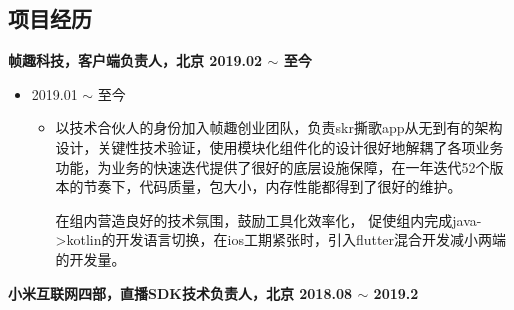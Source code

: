 \documentclass[line,margin,UTF8]{res}
\begin{document}
 
\address{15718887533}

\begin{resume}
 


\section{项目经历} 
{\bf 帧趣科技，客户端负责人，北京 \hfill  2019.02 $\sim$ 至今}
 \vspace{3pt}

  \begin{itemize}
 \item {} 2019.01 $\sim$ 至今
 	\vspace{-3pt}
 	\begin{itemize}
 		\item
 		以技术合伙人的身份加入帧趣创业团队，负责skr撕歌app从无到有的架构设计，关键性技术验证，使用模块化组件化的设计很好地解耦了各项业务功能，为业务的快速迭代提供了很好的底层设施保障，在一年迭代52个版本的节奏下，代码质量，包大小，内存性能都得到了很好的维护。

		在组内营造良好的技术氛围，鼓励工具化效率化，
		促使组内完成java->kotlin的开发语言切换，在ios工期紧张时，引入flutter混合开发减小两端的开发量。

 \end{itemize}
 \end{itemize}

{\bf 小米互联网四部，直播SDK技术负责人，北京 \hfill  2018.08 $\sim$ 2019.2}
 \vspace{3pt}


\end{resume}
\end{document}
